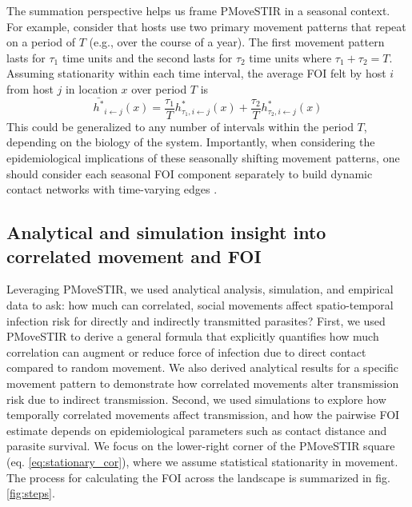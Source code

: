 \documentclass[letterpaper]{article}
\begin{document}
The summation perspective helps us frame PMoveSTIR in a seasonal context.  For example, consider that hosts use two primary movement patterns that repeat on a period of $T$ (e.g., over the course of a year).  The first movement pattern lasts for $\tau_1$ time units and the second lasts for $\tau_2$ time units where $\tau_1 + \tau_2 = T$.  Assuming stationarity within each time interval, the average FOI felt by host $i$ from host $j$ in location $x$ over period $T$ is 
\begin{equation}
\bar{h^*}_{i \leftarrow j}(x) = \frac{\tau_1}{T} h^*_{\tau_1, i \leftarrow j}(x) + \frac{\tau_2}{T} h^*_{\tau_2, i \leftarrow j}(x)
\label{eq:seasonal}
\end{equation}
This could be generalized to any number of intervals within the period $T$, depending on the biology of the system.  Importantly, when considering the epidemiological implications of these seasonally shifting movement patterns, one should consider each seasonal FOI component separately to build dynamic contact networks with time-varying edges \citep{Wilber2022}.


\subsection*{Analytical and simulation insight into correlated movement and FOI}

Leveraging PMoveSTIR, we used analytical analysis, simulation, and empirical data to ask: how much can correlated, social movements affect spatio-temporal infection risk for directly and indirectly transmitted parasites? 
First, we used PMoveSTIR to derive a general formula that explicitly quantifies how much correlation can augment or reduce force of infection due to direct contact compared to random movement. We also derived analytical results for a specific movement pattern to demonstrate how correlated movements alter transmission risk due to indirect transmission.
Second, we used simulations to explore how temporally correlated movements affect  transmission, and how the pairwise FOI estimate depends on epidemiological parameters such as contact distance and parasite survival. We focus on the lower-right corner of the PMoveSTIR square (eq. \ref{eq:stationary_cor}), where we assume statistical stationarity in movement. The process for calculating the FOI across the landscape is summarized in fig. \ref{fig:steps}.
\end{document}
